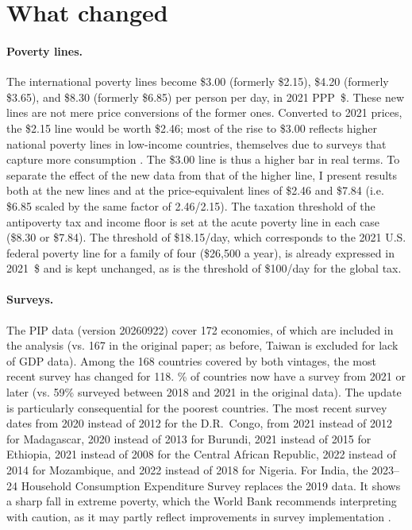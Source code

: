 \section{What changed}

\paragraph{Poverty lines.} The international poverty lines become \$3.00 (formerly \$2.15), \$4.20 (formerly \$3.65), and \$8.30 (formerly \$6.85) per person per day, in 2021 PPP~\$. These new lines are not mere price conversions of the former ones. Converted to 2021 prices, the \$2.15 line would be worth \$2.46; most of the rise to \$3.00 reflects higher national poverty lines in low-income countries, themselves due to surveys that capture more consumption \citep{foster_global_2025}. The \$3.00 line is thus a higher bar in real terms. To separate the effect of the new data from that of the higher line, I present results both at the new lines and at the price-equivalent lines of \$2.46 and \$7.84 (i.e. \$6.85 scaled by the same factor of 2.46/2.15). The taxation threshold of the antipoverty tax and income floor is set at the acute poverty line in each case (\$8.30 or \$7.84). The threshold of \$18.15/day, which corresponds to the 2021 U.S. federal poverty line for a family of four (\$26,500 a year), is already expressed in 2021~\$ and is kept unchanged, as is the threshold of \$100/day for the global tax.

\paragraph{Surveys.} The PIP data (version 20260922) cover 172 economies, of which \upNbCountries{} are included in the analysis (vs. 167 in the original paper; as before, Taiwan is excluded for lack of GDP data). Among the 168 countries covered by both vintages, the most recent survey has changed for 118. \upShareSurveyRecent\% of countries now have a survey from 2021 or later (vs. 59\% surveyed between 2018 and 2021 in the original data). The update is particularly consequential for the poorest countries. The most recent survey dates from 2020 instead of 2012 for the D.R.\ Congo, from 2021 instead of 2012 for Madagascar, 2020 instead of 2013 for Burundi, 2021 instead of 2015 for Ethiopia, 2021 instead of 2008 for the Central African Republic, 2022 instead of 2014 for Mozambique, and 2022 instead of 2018 for Nigeria. For India, the 2023--24 Household Consumption Expenditure Survey replaces the 2019 data. It shows a sharp fall in extreme poverty, which the World Bank recommends interpreting with caution, as it may partly reflect improvements in survey implementation \citep{castaneda_aguilar_september_2026}.

